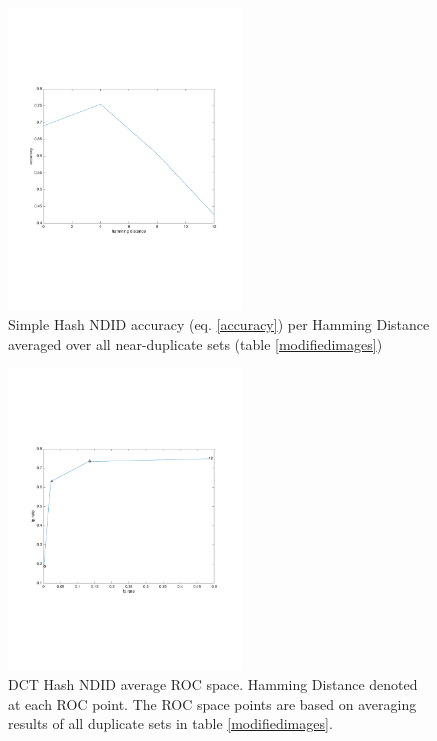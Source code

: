 \documentclass[english,12pt,a4paper,pdftex,elec,utf8, table]{aaltothesis}
\begin{document}
\begin{figure}[htb]
\begin{center}
\includegraphics[height=8cm]{figures/simpleTotalAccuracy}
\end{center}
\caption{Simple Hash NDID accuracy (eq. \ref{accuracy}) per Hamming Distance averaged over all near-duplicate sets (table \ref{modifiedimages})}
\label{simpletotalaccuracy}
\end{figure}

\begin{figure}[htb]
\begin{center}
\includegraphics[height=8cm]{figures/dctTotalROC}
\end{center}
\caption{DCT Hash NDID average ROC space. Hamming Distance denoted at each ROC point. The ROC space points are based on averaging results of all duplicate sets in table \ref{modifiedimages}.}
\label{dcttotalroc}
\end{figure}
\end{document}
